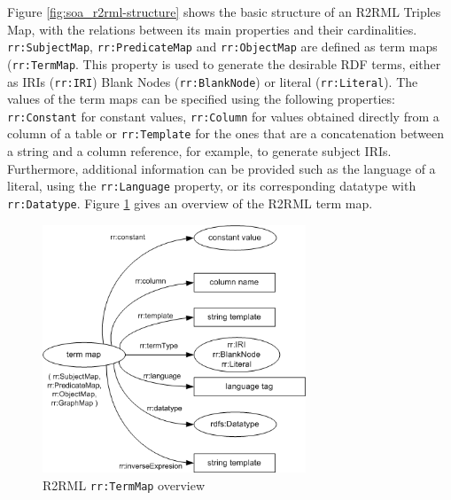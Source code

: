 Figure \ref{fig:soa_r2rml-structure} shows the basic structure of an R2RML Triples Map, with the relations between its main properties and their cardinalities. \texttt{rr:SubjectMap}, \texttt{rr:PredicateMap} and \texttt{rr:ObjectMap} are defined as term maps (\texttt{rr:TermMap}. This property is used to generate the desirable RDF terms, either as IRIs (\texttt{rr:IRI}) Blank Nodes (\texttt{rr:BlankNode}) or literal (\texttt{rr:Literal}). The values of the term maps can be specified using the following properties: \texttt{rr:Constant} for constant values, \texttt{rr:Column} for values obtained directly from a column of a table or \texttt{rr:Template} for the ones that are a concatenation between a string and a column reference, for example, to generate subject IRIs. Furthermore, additional information can be provided such as the language of a literal, using the \texttt{rr:Language} property, or its corresponding datatype with \texttt{rr:Datatype}. Figure \ref{fig:soa_termmap-structure} gives an overview of the R2RML term map.


\begin{figure}[!t]
\centering
\includegraphics[width=0.7\textwidth]{figures/state-of-the-art/term-map.png}
\caption{R2RML \texttt{rr:TermMap} overview~\citep{R2RML}}
\label{fig:soa_termmap-structure}
\end{figure}

